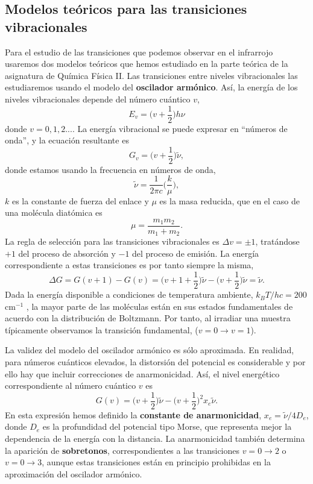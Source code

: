 \documentclass{tufte-book}
\begin{document}
\subsection{Modelos teóricos para las transiciones vibracionales}
Para el estudio de las transiciones que podemos observar en el infrarrojo
usaremos dos modelos teóricos que hemos estudiado en la parte teórica de la
asignatura de Química Física II. Las transiciones entre niveles 
vibracionales las estudiaremos usando el modelo del \textbf{oscilador
armónico}. Así, la energía de los niveles vibracionales depende del 
número cuántico $v$,
\begin{equation}
    E_v=\bigg(v+\frac{1}{2}\bigg)h\nu
\end{equation}
donde $v=0,1,2...$. La energía vibracional se puede expresar en ``números
de onda'', y la ecuación resultante es
\begin{equation}
    G_v=\bigg(v+\frac{1}{2}\bigg)\tilde{\nu},
\end{equation}
donde estamos usando la frecuencia en números de onda,
\begin{equation}
    \tilde{\nu}=\frac{1}{2\pi c}\Big(\frac{k}{\mu}\Big),
    \label{eq:nu}
\end{equation}
$k$ es la constante de fuerza del enlace y $\mu$ es la masa reducida,
que en el caso de una molécula diatómica es 
\begin{equation}
    \mu=\frac{m_1m_2}{m_1+m_2}.
\end{equation}
La regla de selección para las transiciones vibracionales es 
$\Delta v=\pm 1$, tratándose $+1$ del proceso de absorción 
y $-1$ del proceso de emisión. La energía correspondiente a
estas transiciones es por tanto siempre la misma, 
\begin{equation}
    \Delta G=G(v+1)-G(v) = \bigg(v+1+\frac{1}{2}\bigg)\tilde{\nu} -
     \bigg(v+\frac{1}{2}\bigg)\tilde{\nu} = \tilde{\nu}.
\end{equation}
Dada la energía disponible a condiciones de temperatura 
ambiente, $k_BT/hc=200$ cm$^{-1}$ , la mayor parte de las 
moléculas están en sus estados fundamentales de acuerdo con
la distribución de Boltzmann. Por tanto, al irradiar una 
muestra típicamente observamos la transición fundamental, 
($v=0\rightarrow v=1$).

La validez del modelo del oscilador armónico es sólo aproximada.
En realidad, para números cuánticos elevados, la distorsión del
potencial es considerable y por ello hay que incluir correcciones
de anarmonicidad. Así, el nivel energético correspondiente al 
número cuántico $v$ es
\begin{equation}
    G(v) = \bigg(v+\frac{1}{2}\bigg)\tilde{\nu} - \bigg(v+\frac{1}{2}\bigg)^2x_e\tilde{\nu}.
\end{equation}
En esta expresión hemos definido la \textbf{constante de anarmonicidad}, 
$x_e=\tilde{\nu}/4D_e$, donde $D_e$ es la profundidad del potencial
tipo Morse, que representa mejor la dependencia de la energía con
la distancia. La anarmonicidad también determina la aparición
de \textbf{sobretonos}, correspondientes a las transiciones
$v=0\rightarrow 2$ o $v=0\rightarrow 3$, aunque estas transiciones 
están en principio prohibidas en la aproximación del oscilador armónico.
\end{document}
